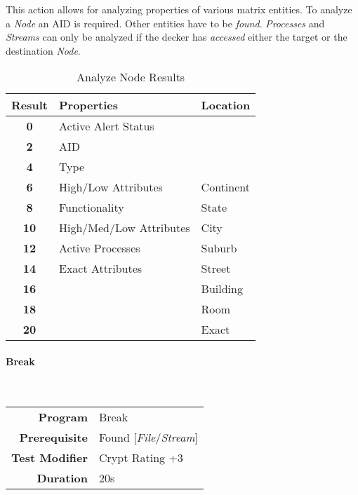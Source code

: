 \hfill

This action allows for analyzing properties of various matrix entities. To analyze a \emph{Node}
an AID is required. Other entities have to be \emph{found}. \emph{Processes} and \emph{Streams}
can only be analyzed if the decker has \emph{accessed} either the target or the destination
\emph{Node}.

\begin{table}[htb]
    \caption[Analyze Node Results]{Analyze Node Results}
    \label{tab:analyze results}
    \centering
    \begin{tabular}{cll}
        \toprule
        \textbf{Result} & \textbf{Properties}     & \textbf{Location} \\
        \midrule
        \textbf{0}      & Active Alert Status     &                   \\
        \textbf{2}      & AID                     &                   \\
        \textbf{4}      & Type                    &                   \\
        \textbf{6}      & High/Low Attributes     & Continent         \\
        \textbf{8}      & Functionality           & State             \\
        \textbf{10}     & High/Med/Low Attributes & City              \\
        \textbf{12}     & Active Processes        & Suburb            \\
        \textbf{14}     & Exact Attributes        & Street            \\
        \textbf{16}     &                         & Building          \\
        \textbf{18}     &                         & Room              \\
        \textbf{20}     &                         & Exact             \\
        \bottomrule
    \end{tabular}
\end{table}

\paragraph{Break}
\label{par: break}

\mbox{}\\

\begin{tabular}{rl}
    \textbf{Program}       & Break                             \\
    \textbf{Prerequisite}  & Found [\emph{File}/\emph{Stream}] \\
    \textbf{Test Modifier} & Crypt Rating +3                   \\
    \textbf{Duration}      & 20s                               \\
\end{tabular}

